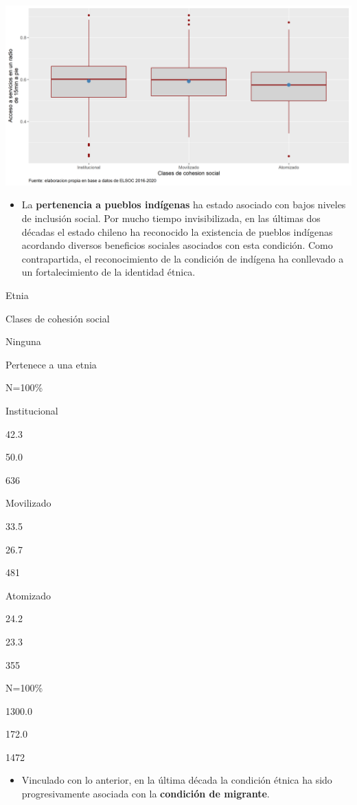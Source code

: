 \documentclass[
  12pt,
]{book}
\providecommand{\tightlist}{%
  \setlength{\itemsep}{0pt}\setlength{\parskip}{0pt}}
\begin{document}
\begin{center}\includegraphics[width=1\linewidth,height=1\textheight]{output/graphs/clase-accs} \end{center}

\begin{itemize}
\tightlist
\item
  La \textbf{pertenencia a pueblos indígenas} ha estado asociado con bajos niveles de inclusión social. Por mucho tiempo invisibilizada, en las últimas dos décadas el estado chileno ha reconocido la existencia de pueblos indígenas acordando diversos beneficios sociales asociados con esta condición. Como contrapartida, el reconocimiento de la condición de indígena ha conllevado a un fortalecimiento de la identidad étnica.
\end{itemize}

Etnia

Clases de cohesión social

Ninguna

Pertenece a una etnia

N=100\%

Institucional

42.3

50.0

636

Movilizado

33.5

26.7

481

Atomizado

24.2

23.3

355

N=100\%

1300.0

172.0

1472

\begin{itemize}
\tightlist
\item
  Vinculado con lo anterior, en la última década la condición étnica ha sido progresivamente asociada con la \textbf{condición de migrante}.
\end{itemize}
\end{document}
